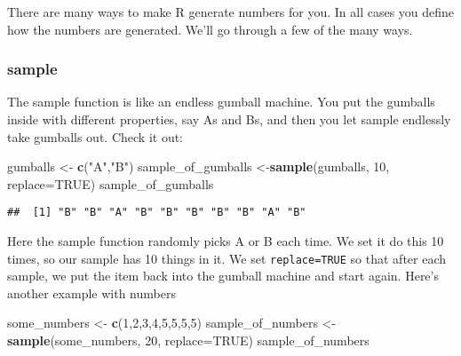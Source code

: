 \documentclass[
]{book}
\newenvironment{Shaded}{\begin{snugshade}}{\end{snugshade}}
\newcommand{\AttributeTok}[1]{\textcolor[rgb]{0.13,0.29,0.53}{#1}}
\newcommand{\ConstantTok}[1]{\textcolor[rgb]{0.56,0.35,0.01}{#1}}
\newcommand{\DecValTok}[1]{\textcolor[rgb]{0.00,0.00,0.81}{#1}}
\newcommand{\FunctionTok}[1]{\textcolor[rgb]{0.13,0.29,0.53}{\textbf{#1}}}
\newcommand{\NormalTok}[1]{#1}
\newcommand{\OtherTok}[1]{\textcolor[rgb]{0.56,0.35,0.01}{#1}}
\newcommand{\StringTok}[1]{\textcolor[rgb]{0.31,0.60,0.02}{#1}}
\begin{document}
There are many ways to make R generate numbers for you. In all cases you
define how the numbers are generated. We'll go through a few of the many
ways.

\hypertarget{sample}{%
\subsubsection{sample}\label{sample}}

The sample function is like an endless gumball machine. You put the
gumballs inside with different properties, say As and Bs, and then you
let sample endlessly take gumballs out. Check it out:

\begin{Shaded}
\begin{Highlighting}[]
\NormalTok{gumballs }\OtherTok{\textless{}{-}} \FunctionTok{c}\NormalTok{(}\StringTok{"A"}\NormalTok{,}\StringTok{"B"}\NormalTok{)}
\NormalTok{sample\_of\_gumballs }\OtherTok{\textless{}{-}}\FunctionTok{sample}\NormalTok{(gumballs, }\DecValTok{10}\NormalTok{, }\AttributeTok{replace=}\ConstantTok{TRUE}\NormalTok{)}
\NormalTok{sample\_of\_gumballs}
\end{Highlighting}
\end{Shaded}

\begin{verbatim}
##  [1] "B" "B" "A" "B" "B" "B" "B" "B" "A" "B"
\end{verbatim}

Here the sample function randomly picks A or B each time. We set it do
this 10 times, so our sample has 10 things in it. We set \texttt{replace=TRUE}
so that after each sample, we put the item back into the gumball machine
and start again. Here's another example with numbers

\begin{Shaded}
\begin{Highlighting}[]
\NormalTok{some\_numbers }\OtherTok{\textless{}{-}} \FunctionTok{c}\NormalTok{(}\DecValTok{1}\NormalTok{,}\DecValTok{2}\NormalTok{,}\DecValTok{3}\NormalTok{,}\DecValTok{4}\NormalTok{,}\DecValTok{5}\NormalTok{,}\DecValTok{5}\NormalTok{,}\DecValTok{5}\NormalTok{,}\DecValTok{5}\NormalTok{)}
\NormalTok{sample\_of\_numbers }\OtherTok{\textless{}{-}}\FunctionTok{sample}\NormalTok{(some\_numbers, }\DecValTok{20}\NormalTok{, }\AttributeTok{replace=}\ConstantTok{TRUE}\NormalTok{)}
\NormalTok{sample\_of\_numbers}
\end{Highlighting}
\end{Shaded}
\end{document}
